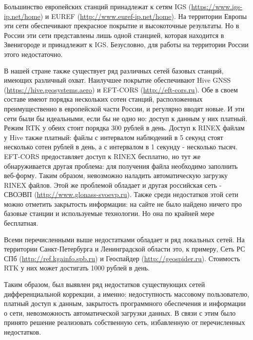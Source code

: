 \documentclass[a4paper,12pt]{report}
\begin{document}
Большинство европейских станций принадлежат к сетям IGS (\url{https://www.igs-ip.net/home}) и EUREF (\url{http://www.euref-ip.net/home}). 
На территории Европы эти сети обеспечивают прекрасное покрытие и высокоточные 
результаты. Но в России эти сети представлены лишь одной станцией, которая находится в Звенигороде и принадлежит к IGS. Безусловно, для работы 
на территории России этого недостаточно. \par
В нашей стране также существует ряд различных сетей базовых станций, имеющих различный охват. Наилучшее покрытие обеспечивают Hive GNSS 
(\url{https://hive.geosystems.aero}) и EFT-CORS (\url{http://eft-cors.ru}). Обе в своем составе имеют порядка нескольких сотен станций, 
расположенных преимущественно в европейской части России, и регулярно 
вводят новые. И эти сети были бы идеальными, если бы не одно но: доступ к данным у них платный. Режим RTK у обеих стоит порядка 300 рублей в день. 
Доступ к RINEX файлам у Hive также платный: файлы с интервалом наблюдений в 5 секунд стоят несколько сотен рублей в день, а с интервалом 
в 1 секунду - несколько тысяч. EFT-CORS предоставляет доступ к RINEX бесплатно, но тут же обнаруживается другая проблема: для получения файла 
необходимо заполнить веб-форму. Таким образом, невозможно наладить автоматическую загрузку RINEX файлов. Этой же проблемой обладает и другая 
российская сеть - СВОЭВП (\url{http://www.glonass-svoevp.ru}). Также среди недостатков этой сети можно отметить закрытость информации: 
на сайте не было найдено ничего про базовые станции и используемые технологии. Но она по крайней мере бесплатная. \par
Всеми перечисленными выше недостатками обладает и ряд локальных сетей. На территории Санкт-Петербурга и Ленинградской области это, к примеру, 
Сеть РС СПб (\url{http://ref.kgainfo.spb.ru}) и Геоспайдер (\url{http://geospider.ru}). Стоимость RTK у них может достигать 1000 рублей в день.
\par Таким образом, был выявлен ряд недостатков существующих сетей дифференциальной коррекции, а именно: недоступность массовому пользователю, 
платный доступ к данным, закрытость программного обеспечения и информации о сети, невозможность автоматической загрузки данных. В связи с этим 
было принято решение реализовать собственную сеть, избавленную от перечисленных недостатков.
\end{document}
